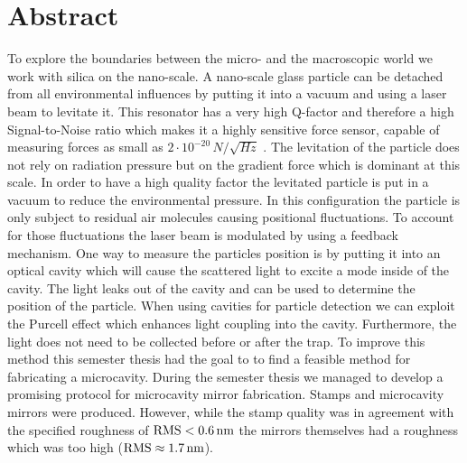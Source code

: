 \section*{Abstract}
To explore the boundaries between the micro- and the macroscopic world we work with silica on the nano-scale. A nano-scale glass particle can be detached from all environmental influences by putting it into a vacuum and using a laser beam to levitate it. This resonator has a very high Q-factor and therefore a high Signal-to-Noise ratio which makes it a highly sensitive force sensor, capable of measuring forces as small as $2\cdot 10^{-20}\,\si{N/\sqrt{Hz}}$ \cite{gieseler2013thermal}. The levitation of the particle does not rely on radiation pressure but on the gradient force which is dominant at this scale. In order to have a high quality factor the levitated particle is put in a vacuum to reduce the environmental pressure. In this configuration the particle is only subject to residual air molecules causing positional fluctuations. To account for those fluctuations the laser beam is modulated by using a feedback mechanism. One way to measure the particles position is by putting it into an optical cavity which will cause the scattered light to excite a mode inside of the cavity. The light leaks out of the cavity and can be used to determine the position of the particle. When using cavities for particle detection we can exploit the Purcell effect which enhances light coupling into the cavity. Furthermore, the light does not need to be collected before or after the trap. To improve this method this semester thesis had the goal to to find a feasible method for fabricating a microcavity. During the semester thesis we managed to develop a promising protocol for microcavity mirror fabrication. Stamps and microcavity mirrors were produced. However, while the stamp quality was in agreement with the specified roughness of $\si{RMS}<0.6\nm$ the mirrors themselves had a roughness which was too high ($\si{RMS}\approx 1.7\nm$). 
